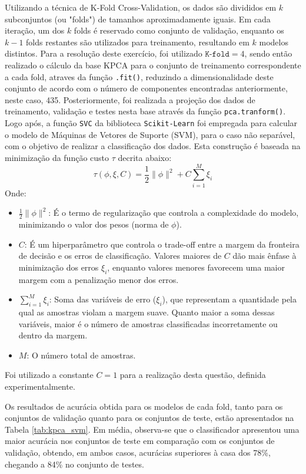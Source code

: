 \documentclass[]{abntex2}
\begin{document}
Utilizando a técnica de K-Fold Cross-Validation, os dados são divididos em \( k \) subconjuntos (ou "folds") de tamanhos aproximadamente iguais. Em cada iteração, um dos \( k \) folds é reservado como conjunto de validação, enquanto os \( k-1 \) folds restantes são utilizados para treinamento, resultando em \( k \) modelos distintos. Para a resolução deste exercício, foi utilizado \( \texttt{K-fold} = 4 \), sendo então realizado o cálculo da base KPCA para o conjunto de treinamento correspondente a cada fold, atraves da função \texttt{.fit()}, reduzindo a dimensionalidade deste conjunto de acordo com o número de componentes encontradas anteriormente, neste caso, 435. Posteriormente, foi realizada a projeção dos dados de treinamento, validação e testes nesta base através da função \texttt{pca.tranform()}. Logo após, a função \texttt{SVC} da biblioteca \texttt{Scikit-Learn} foi empregada para calcular o modelo de Máquinas de Vetores de Suporte (SVM), para o caso não separável, com o objetivo de realizar a classificação dos dados. Esta construção é baseada na minimização da função custo $\tau$ decrita abaixo:
\[
\tau(\phi, \xi, C) = \frac{1}{2} \|\phi\|^2 + C \sum_{i=1}^{M} \xi_i
\]
Onde:
\begin{itemize}
    \item \(\frac{1}{2} \|\phi\|^2\): É o termo de regularização que controla a complexidade do modelo, minimizando o valor dos pesos (norma de \(\phi\)).
    \item \(C\): É um hiperparâmetro que controla o trade-off entre a margem da fronteira de decisão e os erros de classificação. Valores maiores de \(C\) dão mais ênfase à minimização dos erros \(\xi_i\), enquanto valores menores favorecem uma maior margem com a penalização menor dos erros.
    \item \(\sum_{i=1}^{M} \xi_i\): Soma das variáveis de erro (\(\xi_i\)), que representam a quantidade pela qual as amostras violam a margem suave. Quanto maior a soma dessas variáveis, maior é o número de amostras classificadas incorretamente ou dentro da margem.
    \item \(M\): O número total de amostras.
\end{itemize}

Foi utilizado a constante $C=1$ para a realização desta questão, definida experimentalmente.

Os resultados de acurácia obtida para os modelos de cada fold, tanto para os conjuntos de validação quanto para os conjuntos de teste, estão apresentados na Tabela \ref{tab:kpca_svm}. Em média, observa-se que o classificador apresentou uma maior acurácia nos conjuntos de teste em comparação com os conjuntos de validação, obtendo, em ambos casos, acurácias superiores à casa dos 78\%, chegando a 84\% no conjunto de testes.
\end{document}
